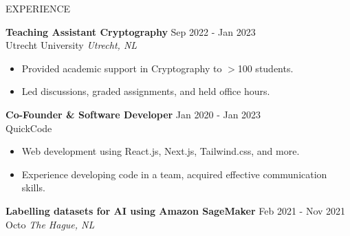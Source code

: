 \documentclass{resume} %
\begin{document}
\begin{rSection}{EXPERIENCE}


\textbf{Teaching Assistant Cryptography} \hfill Sep 2022 - Jan 2023\\
Utrecht University \hfill \textit{Utrecht, NL}
 \begin{itemize}
    \itemsep -3pt {} 
    \item Provided academic support in Cryptography to $>$100 students.
    \item Led discussions, graded assignments, and held office hours.
 \end{itemize}
 
 \textbf{Co-Founder \& Software Developer} \hfill Jan 2020 - Jan 2023\\
QuickCode %
 \begin{itemize}
    \itemsep -3pt {} 
     \item Web development using React.js, Next.js, Tailwind.css, and more.
     \item Experience developing code in a team, acquired effective communication skills.
 \end{itemize}

\textbf{Labelling datasets for AI using Amazon SageMaker} \hfill Feb 2021 - Nov 2021\\
Octo \hfill \textit{The Hague, NL}

\end{rSection} 

\end{document}

